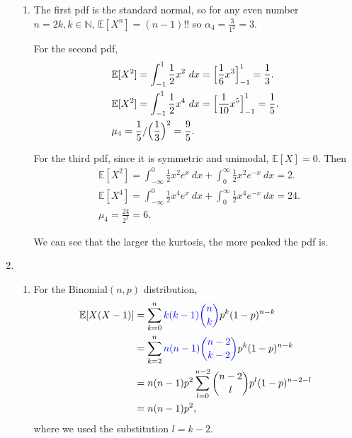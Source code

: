\documentclass{article}
\begin{document}
\begin{enumerate}
\begin{enumerate}
        \item The first pdf is the standard normal, so for any even number $n = 2k, k \in \mathbb{N}$, 
        $\mathbb{E}[X^n] = (n - 1)!!$ so $\alpha_4 = \frac{3}{1^2} = 3$.

        For the second pdf, 
        \begin{align*}
            &\mathbb{E}[X^2] 
            = \int_{-1}^{1} \frac{1}{2}x^2 \ dx 
            = \Bigl[ \frac{1}{6}x^3 \Bigr]_{-1}^{1} 
            = \frac{1}{3}. \\
            &\mathbb{E}[X^2] 
            = \int_{-1}^{1} \frac{1}{2}x^4 \ dx 
            = \Bigl[ \frac{1}{10}x^5 \Bigr]_{-1}^{1} 
            = \frac{1}{5}. \\
            &\mu_4 
            = \frac{1}{5} / \Bigl( \frac{1}{3} \Bigr)^2 
            = \frac{9}{5}.
        \end{align*}

        For the third pdf, since it is symmetric and unimodal, $\mathbb{E}[X] = 0$. Then 
        \begin{align*}
            &\mathbb{E}[X^2]
            = \int_{-\infty}^{0} \frac{1}{2}x^2 e^x \ dx + \int_{0}^{\infty} \frac{1}{2}x^2 e^{-x} \ dx 
            = 2. \\
            &\mathbb{E}[X^4]
            = \int_{-\infty}^{0} \frac{1}{2}x^4 e^x \ dx + \int_{0}^{\infty} \frac{1}{2}x^4 e^{-x} \ dx 
            = 24. \\
            &\mu_4 
            = \frac{24}{2^2} 
            = 6.
        \end{align*}

        We can see that the larger the kurtosis, the more peaked the pdf is.
    \end{enumerate}

    \item \begin{enumerate}
        \item For the $\text{Binomial}(n, p)$ distribution, 
        \begin{align*}
            \mathbb{E}[X(X - 1)]
            &= \sum_{k = 0}^{n} {\color{blue} k(k - 1) \binom{n}{k}} p^k (1 - p)^{n - k} \\
            &= \sum_{k = 2}^{n} {\color{blue} n(n - 1) \binom{n - 2}{k - 2}} p^k (1 - p)^{n - k} \\
            &= n(n - 1)p^2 \sum_{l = 0}^{n - 2} \binom{n - 2}{l} p^l (1 - p)^{n - 2 - l} \\
            &= n(n - 1)p^2,
        \end{align*}
        where we used the substitution $l = k - 2$.


\end{enumerate}
\end{enumerate}
\end{document}
